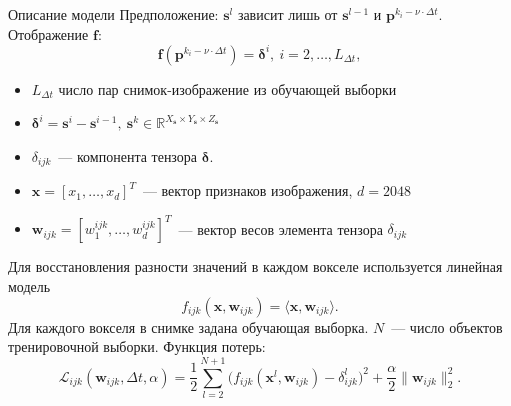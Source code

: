 \documentclass[9pt,pdf]{beamer} %
\begin{document}
\begin{frame}{Описание модели}
Предположение: $\bm{s}^l$ зависит лишь от $\bm{s}^{l-1}$ и $\bm{p}^{k_i - \nu \cdot \Delta t}$. Отображение $\bm{f}$:
\begin{equation*}
	\label{main_model}
	\bm{f}(\bm{p}^{k_i - \nu \cdot \Delta t}) = \bm{\delta}^i, \ i = 2, \ldots, L_{\Delta t}, 
\end{equation*}
\begin{itemize}
    \item $L_{\Delta t}$ число пар снимок-изображение из обучающей выборки 
    \item $\bm{\delta}^i = \bm{s}^i - \bm{s}^{i-1},~\bm{s}^k \in \mathbb{R}^{X_{\bm{s}} \times Y_{\bm{s}} \times Z_{\bm{s}}}$
    \item $\delta_{ijk}$~--- компонента тензора $\bm{\delta}$.
    \item $\bm{x} = [x_1, \ldots, x_{d}]^{T}$~--- вектор признаков изображения, $d=2048$ 
    \item $\bm{w}_{ijk} = [w^{ijk}_1, \ldots, w^{ijk}_{d}]^{T}$~--- вектор весов элемента тензора $\delta_{ijk}$
\end{itemize}
    Для восстановления разности значений в каждом вокселе используется линейная модель
\begin{equation*}
	\label{f_ijk}
	f_{ijk}(\bm{x}, \bm{w}_{ijk}) = \langle \bm{x}, \bm{w}_{ijk} \rangle.
 \end{equation*}
 Для каждого вокселя в снимке задана обучающая выборка.
$N$~--- число объектов тренировочной выборки. Функция потерь:
\begin{equation*}
	\label{Loss}
	\mathcal{L}_{ijk}(\bm{w}_{ijk}, \Delta t, \alpha) = \frac{1}{2} \sum\limits_{l = 2}^{N+1} \big(f_{ijk}(\bm{x}^l, \bm{w}_{ijk}) - \delta^{l}_{ijk}\big)^2 + \frac{\alpha}{2} \|\bm{w}_{ijk}\|^2_2.
\end{equation*}
\end{frame}
\end{document}
